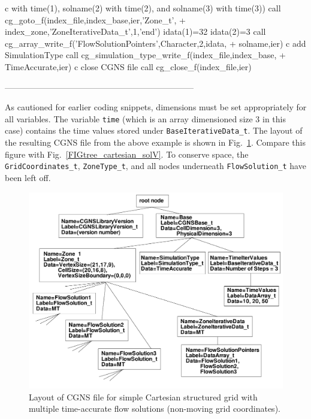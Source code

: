 \documentclass[12pt]{article}
\begin{document}
{\newline c   with time(1), solname(2) with time(2), and solname(3) with time(3))
\newline\indent      call cg\_goto\_f(index\_file,index\_base,ier,'Zone\_t',
\newline + \indent index\_zone,'ZoneIterativeData\_t',1,'end')
\newline\indent      idata(1)=32
\newline\indent      idata(2)=3
\newline\indent      call cg\_array\_write\_f('FlowSolutionPointers',Character,2,idata,
\newline + \indent    solname,ier)
\newline c   add SimulationType
\newline\indent      call cg\_simulation\_type\_write\_f(index\_file,index\_base,
\newline + \indent TimeAccurate,ier)
\newline c   close CGNS file
\newline\indent      call cg\_close\_f(index\_file,ier)
}

--------------------------------------------------------------------

As cautioned for earlier coding snippets, dimensions must be set appropriately
for all variables.  The variable {\tt time} (which is an array dimensioned size 3 in this case)
contains the time values stored under {\tt BaseIterativeData\_t}.
The layout of the resulting CGNS file
from the above example is shown in Fig.~\ref{FIGtree_cartesian_soltime}.
Compare this figure with Fig.~\ref{FIGtree_cartesian_solV}.  To
conserve space, the {\tt GridCoordinates\_t}, {\tt ZoneType\_t}, and
all nodes underneath {\tt FlowSolution\_t} have been left off.

\begin{figure}[hpbt]
\centerline{{\includegraphics[width=150mm]{figures/tree_cartesian_soltime}}}
\caption{Layout of CGNS file for simple Cartesian
structured grid with multiple time-accurate flow solutions
(non-moving grid coordinates).}
\label{FIGtree_cartesian_soltime}
\end{figure}
%
\end{document}
